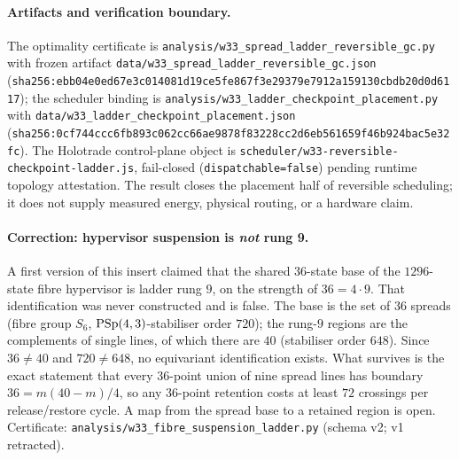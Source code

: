 \paragraph{Artifacts and verification boundary.}
The optimality certificate is
\texttt{analysis/w33\_spread\_ladder\_reversible\_gc.py} with frozen artifact
\texttt{data/w33\_spread\_ladder\_reversible\_gc.json}
(\texttt{sha256:ebb04e0ed67e3c014081d19ce5fe867f3e29379e7912a159130cbdb20d0d6117});
the scheduler binding is
\texttt{analysis/w33\_ladder\_checkpoint\_placement.py} with
\texttt{data/w33\_ladder\_checkpoint\_placement.json}
(\texttt{sha256:0cf744ccc6fb893c062cc66ae9878f83228cc2d6eb561659f46b924bac5e32fc}).
The Holotrade control-plane object is
\texttt{scheduler/w33-reversible-checkpoint-ladder.js}, fail-closed
(\texttt{dispatchable=false}) pending runtime topology attestation.  The result closes
the placement half of reversible scheduling; it does not supply measured energy,
physical routing, or a hardware claim.

\paragraph{Correction: hypervisor suspension is \emph{not} rung 9.}
A first version of this insert claimed that the shared $36$-state base of the $1296$-state
fibre hypervisor is ladder rung $9$, on the strength of $36=4\cdot9$.  That identification
was never constructed and is false.  The base is the set of $36$ spreads (fibre group
$S_6$, $\mathrm{PSp}(4,3)$-stabiliser order $720$); the rung-$9$ regions are the complements of
single lines, of which there are $40$ (stabiliser order $648$).  Since $36\neq40$ and
$720\neq648$, no equivariant identification exists.  What survives is the exact statement
that every $36$-point union of nine spread lines has boundary $36=m(40-m)/4$, so any
$36$-point retention costs at least $72$ crossings per release/restore cycle.  A map
from the spread base to a retained region is open.  Certificate:
\texttt{analysis/w33\_fibre\_suspension\_ladder.py} (schema v2; v1 retracted).
